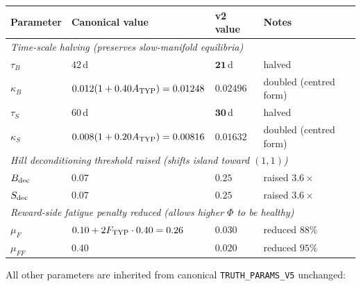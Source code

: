 \documentclass[11pt,a4paper]{article}
\theoremstyle{definition}
\begin{document}
\begin{center}\small
\begin{tabular}{llll}
\toprule
Parameter & Canonical value & v2 value & Notes \\
\midrule
\multicolumn{4}{l}{\emph{Time-scale halving (preserves slow-manifold equilibria)}} \\
$\tau_B$         & $42$\,d              & $\boldsymbol{21}$\,d                         & halved \\
$\kappa_B$       & $0.012(1 + 0.40 A_{\rm TYP}) = 0.01248$ & $\boldsymbol{0.02496}$    & doubled (centred form) \\
$\tau_S$         & $60$\,d              & $\boldsymbol{30}$\,d                         & halved \\
$\kappa_S$       & $0.008(1 + 0.20 A_{\rm TYP}) = 0.00816$ & $\boldsymbol{0.01632}$    & doubled (centred form) \\
\midrule
\multicolumn{4}{l}{\emph{Hill deconditioning threshold raised (shifts island toward $(1,1)$)}} \\
$B_{\rm dec}$    & $0.07$               & $\boldsymbol{0.25}$                          & raised $3.6\times$ \\
$S_{\rm dec}$    & $0.07$               & $\boldsymbol{0.25}$                          & raised $3.6\times$ \\
\midrule
\multicolumn{4}{l}{\emph{Reward-side fatigue penalty reduced (allows higher $\Phi$ to be healthy)}} \\
$\mu_F$          & $0.10 + 2 F_{\rm TYP} \cdot 0.40 = 0.26$ & $\boldsymbol{0.030}$        & reduced $88\%$ \\
$\mu_{FF}$       & $0.40$               & $\boldsymbol{0.020}$                         & reduced $95\%$ \\
\bottomrule
\end{tabular}
\end{center}

All other parameters are inherited from canonical \texttt{TRUTH\_PARAMS\_V5} unchanged:
\end{document}
